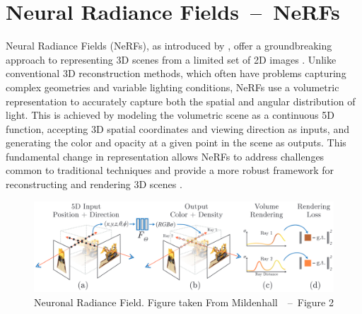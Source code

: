 \section{Neural Radiance Fields~--~NeRFs}\label{NeRF}

Neural Radiance Fields (NeRFs), as introduced by \citeauthor{mildenhallNERF}, offer a groundbreaking approach to representing 3D scenes from a limited set of 2D images \citep{mildenhallNERF}. Unlike conventional 3D reconstruction methods, which often have problems capturing complex geometries and variable lighting conditions, NeRFs use a volumetric representation to accurately capture both the spatial and angular distribution of light. This is achieved by modeling the volumetric scene as a continuous 5D function, accepting 3D spatial coordinates and viewing direction as inputs, and generating the color and opacity at a given point in the scene as outputs. This fundamental change in representation allows NeRFs to address challenges common to traditional techniques and provide a more robust framework for reconstructing and rendering 3D scenes \citep{mildenhallNERF}.

\begin{figure}[ht]
    \centering
      \includegraphics[width=1\columnwidth]{figures/NeRF_Fig_2_Mildenhall.png}
      \caption{Neuronal Radiance Field. Figure taken From Mildenhall~\cite{mildenhallNERF}~--~Figure 2}\label{fig:figureNeRF}
\end{figure}


